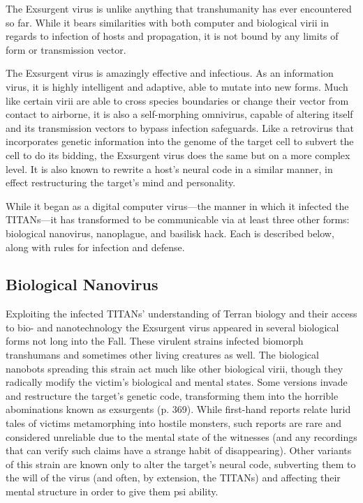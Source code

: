 The Exsurgent virus is unlike anything that transhumanity
has ever encountered so far. While it bears
similarities with both computer and biological virii in 
regards to infection of hosts and propagation, it is not 
bound by any limits of form or transmission vector. 

The Exsurgent virus is amazingly effective and 
infectious. As an information virus, it is highly intelligent
and adaptive, able to mutate into new forms.
Much like certain virii are able to cross species 
boundaries or change their vector from contact to 
airborne, it is also a self-morphing omnivirus, capable
of altering itself and its transmission vectors
to bypass infection safeguards. Like a retrovirus that 
incorporates genetic information into the genome of 
the target cell to subvert the cell to do its bidding, the 
Exsurgent virus does the same but on a more complex
level. It is also known to rewrite a host's neural
code in a similar manner, in effect restructuring the 
target's mind and personality.

While it began as a digital computer virus—the 
manner in which it infected the TITANs—it has transformed
to be communicable via at least three other
forms: biological nanovirus, nanoplague, and basilisk 
hack. Each is described below, along with rules for 
infection and defense.

\subsection{Biological Nanovirus}

Exploiting the infected TITANs' understanding of 
Terran biology and their access to bio- and nanotechnology
the Exsurgent virus appeared in several biological
forms not long into the Fall. These virulent strains
infected biomorph transhumans and sometimes other 
living creatures as well. The biological nanobots 
spreading this strain act much like other biological 
virii, though they radically modify the victim's biological
and mental states. Some versions invade and
restructure the target's genetic code, transforming 
them into the horrible abominations known as exsurgents
(p. 369). While first-hand reports relate lurid
tales of victims metamorphing into hostile monsters, 
such reports are rare and considered unreliable due to 
the mental state of the witnesses (and any recordings 
that can verify such claims have a strange habit of 
disappearing). Other variants of this strain are known 
only to alter the target's neural code, subverting them 
to the will of the virus (and often, by extension, the 
TITANs) and affecting their mental structure in order 
to give them psi ability.

